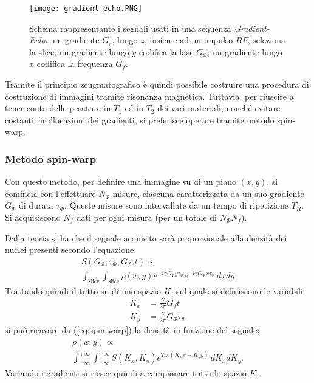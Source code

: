 \begin{figure}
\centering
\texttt{[image: gradient-echo.PNG]}
\caption{Schema rappresentante i segnali usati in una sequenza \textit{Gradient-Echo}, un gradiente $G_s$, lungo $z$, insieme ad un impulso $RF$, seleziona la slice; un gradiente lungo $y$ codifica la fase $G_\Phi$; un gradiente lungo $x$ codifica la frequenza $G_f$. \cite{website}}
\label{fig:GEcho}
\end{figure}

Tramite il principio zeugmatografico è quindi possibile costruire una procedura di costruzione di immagini tramite risonanza magnetica. 
Tuttavia, per riuscire a tener conto delle pesature in $T_1$ ed in $T_2$ dei vari materiali, nonché evitare costanti ricollocazioni dei gradienti, si preferisce operare tramite metodo spin-warp.

\subsubsection*{Metodo spin-warp}

Con questo metodo, per definire una immagine su di un piano $(x,y)$, si comincia con l'effettuare $N_{\Phi}$ misure, ciascuna caratterizzata da un suo gradiente $G_{\Phi}$ di durata $\tau_{\Phi}$. Queste misure sono intervallate da un tempo di ripetizione $T_R$. Si acquisiscono $N_f$ dati per ogni misura (per un totale di $N_{\Phi}N_f$).

Dalla teoria \cite{dhawan2011medical} si ha che il segnale acquisito sarà proporzionale alla densità dei nuclei presenti secondo l'equazione:
\begin{multline}
	S(G_{\Phi}, \tau_{\Phi}, G_f, t) \propto\\ \int_{\text{slice}}\int_{\text{slice}} \rho(x,y) e^{-i\gamma G_\Phi y \tau_\Phi}e^{-i\gamma G_\Phi x \tau_\Phi} \, dxdy
	\label{eq:spin-warp}
\end{multline}
Trattando quindi il tutto su di uno spazio $K$, sul quale si definiscono le variabili
\begin{align}
	K_x &= \frac{\gamma}{2\pi}G_f t \\
	K_y &= \frac{\gamma}{2\pi}G_\Phi \tau_\Phi
\end{align}
si può ricavare da (\ref{eq:spin-warp}) la densità in funzione del segnale:
\begin{multline}
	\rho(x,y) \propto \\\int_{-\infty}^{+\infty}\int_{-\infty}^{+\infty} S(K_x,K_y) e^{2i\pi(K_x x +K_y y)}\, dK_x dK_y    .
\end{multline}
Variando i gradienti si riesce quindi a campionare tutto lo spazio $K$.


